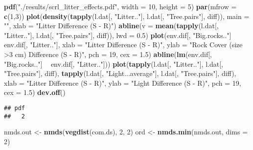 \documentclass[]{article}
\newenvironment{Shaded}{\begin{snugshade}}{\end{snugshade}}
\newcommand{\KeywordTok}[1]{\textcolor[rgb]{0.13,0.29,0.53}{\textbf{#1}}}
\newcommand{\DataTypeTok}[1]{\textcolor[rgb]{0.13,0.29,0.53}{#1}}
\newcommand{\DecValTok}[1]{\textcolor[rgb]{0.00,0.00,0.81}{#1}}
\newcommand{\FloatTok}[1]{\textcolor[rgb]{0.00,0.00,0.81}{#1}}
\newcommand{\StringTok}[1]{\textcolor[rgb]{0.31,0.60,0.02}{#1}}
\newcommand{\OperatorTok}[1]{\textcolor[rgb]{0.81,0.36,0.00}{\textbf{#1}}}
\newcommand{\NormalTok}[1]{#1}
\begin{document}
\begin{Shaded}
\begin{Highlighting}[]
\KeywordTok{pdf}\NormalTok{(}\StringTok{"./results/scrl_litter_effects.pdf"}\NormalTok{, }\DataTypeTok{width =} \DecValTok{10}\NormalTok{, }\DataTypeTok{height =} \DecValTok{5}\NormalTok{)}
\KeywordTok{par}\NormalTok{(}\DataTypeTok{mfrow =} \KeywordTok{c}\NormalTok{(}\DecValTok{1}\NormalTok{,}\DecValTok{3}\NormalTok{))}
\KeywordTok{plot}\NormalTok{(}\KeywordTok{density}\NormalTok{(}\KeywordTok{tapply}\NormalTok{(l.dat[, }\StringTok{"Litter.."}\NormalTok{], l.dat[, }\StringTok{"Tree.pairs"}\NormalTok{], diff)), }
    \DataTypeTok{main =} \StringTok{""}\NormalTok{, }\DataTypeTok{xlab =} \StringTok{"Litter Difference (S - R)"}\NormalTok{)}
\KeywordTok{abline}\NormalTok{(}\DataTypeTok{v =} \KeywordTok{mean}\NormalTok{(}\KeywordTok{tapply}\NormalTok{(l.dat[, }\StringTok{"Litter.."}\NormalTok{], l.dat[, }\StringTok{"Tree.pairs"}\NormalTok{], diff)),}
    \DataTypeTok{lwd =} \FloatTok{0.5}\NormalTok{)}
\KeywordTok{plot}\NormalTok{(env.dif[, }\StringTok{"Big.rocks.."}\NormalTok{] }\OperatorTok{~}\StringTok{ }\NormalTok{env.dif[, }\StringTok{"Litter.."}\NormalTok{], }
     \DataTypeTok{xlab =} \StringTok{"Litter Difference (S - R)"}\NormalTok{, }\DataTypeTok{ylab =} \StringTok{"Rock Cover (size >3 cm) Difference (S - R)"}\NormalTok{,}
     \DataTypeTok{pch =} \DecValTok{19}\NormalTok{, }\DataTypeTok{cex =} \FloatTok{1.5}\NormalTok{)}
\KeywordTok{abline}\NormalTok{(}\KeywordTok{lm}\NormalTok{(env.dif[, }\StringTok{"Big.rocks.."}\NormalTok{] }\OperatorTok{~}\StringTok{ }\NormalTok{env.dif[, }\StringTok{"Litter.."}\NormalTok{]))}
\KeywordTok{plot}\NormalTok{(}\KeywordTok{tapply}\NormalTok{(l.dat[, }\StringTok{"Litter.."}\NormalTok{], l.dat[, }\StringTok{"Tree.pairs"}\NormalTok{], diff), }
    \KeywordTok{tapply}\NormalTok{(l.dat[, }\StringTok{"Light...average"}\NormalTok{], l.dat[, }\StringTok{"Tree.pairs"}\NormalTok{], diff), }
    \DataTypeTok{xlab =} \StringTok{"Litter Difference (S - R)"}\NormalTok{, }\DataTypeTok{ylab =} \StringTok{"Light Difference (S - R)"}\NormalTok{,}
    \DataTypeTok{pch =} \DecValTok{19}\NormalTok{, }\DataTypeTok{cex =} \FloatTok{1.5}\NormalTok{)}
\KeywordTok{dev.off}\NormalTok{()}
\end{Highlighting}
\end{Shaded}

\begin{verbatim}
## pdf 
##   2
\end{verbatim}

\begin{Shaded}
\begin{Highlighting}[]
\NormalTok{nmds.out <-}\StringTok{ }\KeywordTok{nmds}\NormalTok{(}\KeywordTok{vegdist}\NormalTok{(com.ds), }\DecValTok{2}\NormalTok{, }\DecValTok{2}\NormalTok{)}
\NormalTok{ord <-}\StringTok{ }\KeywordTok{nmds.min}\NormalTok{(nmds.out, }\DataTypeTok{dims =} \DecValTok{2}\NormalTok{)}
\end{Highlighting}
\end{Shaded}
\end{document}
